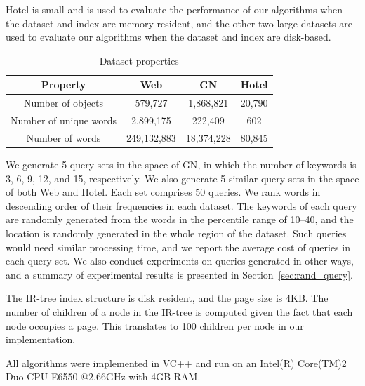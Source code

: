 \documentclass{sig-alternate}
\begin{document}
\textsf{Hotel} is small and is used to evaluate the performance of
our algorithms when the dataset and index are memory resident, and
the other two large datasets are used to evaluate our algorithms
when the dataset and index are disk-based.

\begin{table}[h] \vspace{-1ex}
  \centering \small
  \begin{tabular}{|c|c|c|c|}
    \hline
    \textbf{Property}  & \bf Web & \bf GN& \bf Hotel\\
    \hline
    Number of objects  & 579,727 & 1,868,821& 20,790\\
    \hline
    Number of unique words  & 2,899,175 & 222,409& 602\\
    \hline
    Number of words & 249,132,883 & 18,374,228& 80,845\\
    \hline
  \end{tabular}
  \vspace{-2ex}
  \caption{Dataset properties}
  \label{table:dataset}
\vspace{-2ex}
\end{table}


We generate 5 query sets in the space of \textsf{GN}, in which the
number of keywords is 3, 6, 9, 12, and 15, respectively. We also
generate 5 similar query sets in the space of both \textsf{Web} and
\textsf{Hotel}. Each set comprises 50 queries.
We rank words in descending order of their frequencies in each
dataset. The keywords of each query are randomly generated from the
words in the percentile range of 10--40, and the location is
randomly generated in the whole region of the dataset. Such queries
would need similar processing time, and we report the average cost
of queries in each query set.
%
We also conduct experiments on queries generated in other ways, and
a summary of experimental results is presented in
Section~\ref{sec:rand_query}.

 The IR-tree index structure is disk resident,
and the page size is 4KB. The number of children of a node in the
IR-tree is computed given the fact that each node occupies a page.
This translates to 100 children per node in our implementation.

All algorithms were implemented in VC++ and run on an Intel(R)
Core(TM)2 Duo CPU E6550 @2.66GHz with 4GB RAM.
\end{document}
